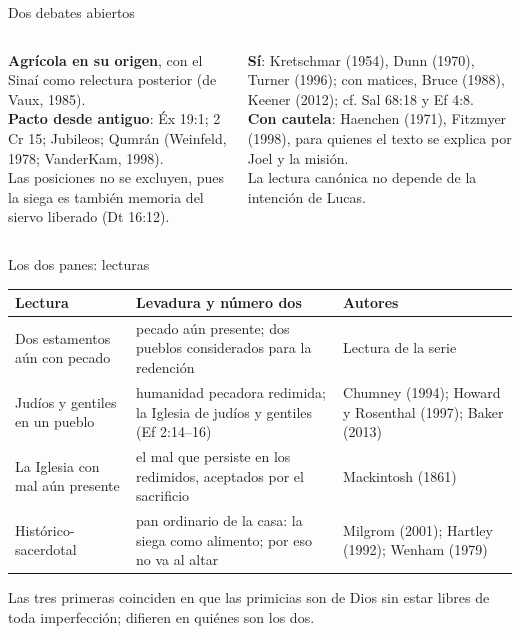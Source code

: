 \begin{frame}{Dos debates abiertos}
\begin{columns}[t,onlytextwidth]
\begin{column}{0.49\textwidth}
\begin{tcolorbox}[colback=papiro,colframe=sepia,boxrule=0.7pt,arc=2pt,left=4pt,right=4pt,fonttitle=\bfseries\scriptsize,coltitle=papiro,colbacktitle=sepia,title={¿Fiesta agrícola o del pacto?}]
\scriptsize\RaggedRight \textbf{Agrícola en su origen}, con el Sinaí como relectura posterior (de Vaux, 1985).\\ \textbf{Pacto desde antiguo}: Éx 19:1; 2 Cr 15; Jubileos; Qumrán (Weinfeld, 1978; VanderKam, 1998).\\ Las posiciones no se excluyen, pues la siega es también memoria del siervo liberado (Dt 16:12).
\end{tcolorbox}
\end{column}
\begin{column}{0.49\textwidth}
\begin{tcolorbox}[colback=papiro,colframe=tierraroja,boxrule=0.7pt,arc=2pt,left=4pt,right=4pt,fonttitle=\bfseries\scriptsize,coltitle=papiro,colbacktitle=tierraroja,title={¿Lucas narra con el Sinaí al fondo?}]
\scriptsize\RaggedRight \textbf{Sí}: Kretschmar (1954), Dunn (1970), Turner (1996); con matices, Bruce (1988), Keener (2012); cf. Sal 68:18 y Ef 4:8.\\ \textbf{Con cautela}: Haenchen (1971), Fitzmyer (1998), para quienes el texto se explica por Joel y la misión.\\ La lectura canónica no depende de la intención de Lucas.
\end{tcolorbox}
\end{column}
\end{columns}
\end{frame}

\begin{frame}{Los dos panes: lecturas}
\scriptsize\renewcommand{\arraystretch}{1.18}
\begin{tabular}{@{}L{2.9cm}L{5.4cm}L{3.6cm}@{}}
\toprule
\textbf{Lectura} & \textbf{Levadura y número dos} & \textbf{Autores} \\ \midrule
Dos estamentos aún con pecado & pecado aún presente; dos pueblos considerados para la redención & Lectura de la serie \\
Judíos y gentiles en un pueblo & humanidad pecadora redimida; la Iglesia de judíos y gentiles (Ef 2:14--16) & Chumney (1994); Howard y Rosenthal (1997); Baker (2013) \\
La Iglesia con mal aún presente & el mal que persiste en los redimidos, aceptados por el sacrificio & Mackintosh (1861) \\
Histórico-sacerdotal & pan ordinario de la casa: la siega como alimento; por eso no va al altar & Milgrom (2001); Hartley (1992); Wenham (1979) \\
\bottomrule
\end{tabular}\par\medskip
\small\RaggedRight Las tres primeras coinciden en que las primicias  son de Dios sin estar libres de toda imperfección; difieren en quiénes son los dos.
\end{frame}

